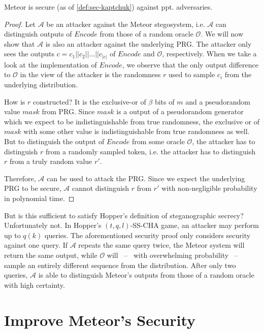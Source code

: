 \begin{theorem}
	Meteor is secure (as of \autoref{def:sec-kaptchuk}) against ppt. adversaries. 
\label{thm:meteor-secure}
\end{theorem}
\begin{proof}
	Let $\mathcal{A}$ be an attacker against the Meteor stegosystem, i.e. $\mathcal{A}$ can distinguish outputs of $Encode$ from those of a random oracle $\mathcal{O}$. 
	We will now show that $\mathcal{A}$ is also an attacker against the underlying PRG.
	The attacker only sees the outputs $c = c_1 ||c_2 || \dots || c_{|c|}$ of $Encode$ and $\mathcal{O}$, respectively. 
	When we take a look at the implementation of $Encode$, we observe that the only output difference to $\mathcal{O}$ in the view of the attacker is the randomness $r$ used to sample $c_i$ from the underlying distribution.
	
	How is $r$ constructed? 
	It is the exclusive-or of $\beta$ bits of $m$ and a pseudorandom value $mask$ from PRG.
	Since $mask$ is a output of a pseudorandom generator which we expect to be indistinguishable from true randomness, the exclusive or of $mask$ with some other value is indistinguishable from true randomness as well.
	But to distinguish the output of $Encode$ from some oracle $\mathcal{O}$, the attacker has to distinguish $r$ from a randomly sampled token, i.e. the attacker has to distinguish $r$ from a truly random value $r'$.
	
	Therefore, $\mathcal{A}$ can be used to attack the PRG.
	Since we expect the underlying PRG to be secure, $\mathcal{A}$ cannot distinguish $r$ from $r'$ with non-negligible probability in polynomial time.
\end{proof}

But is this sufficient to satisfy Hopper's definition of steganographic secrecy?
Unfortunately not.
In Hopper's $(t,q,l)$-SS-CHA game, an attacker may perform up to $q(k)$ queries.
The aforementioned security proof only considers security against one query.
If $\mathcal{A}$ repeats the same query twice, the Meteor system will return the same output, while $\mathcal{O}$ will~ --~ with overwhelming probability~ --~ sample an entirely different sequence from the distribution.
After only two queries, $\mathcal{A}$ is able to distinguish Meteor's outputs from those of a random oracle with high certainty.


\section{Improve Meteor's Security}

